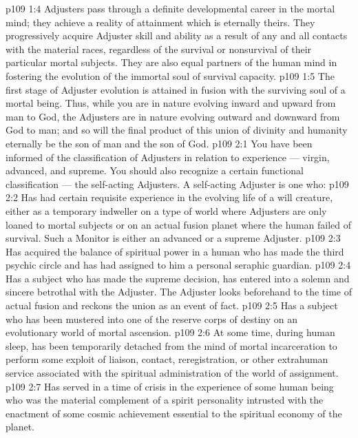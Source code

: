 \vs p109 1:4 Adjusters pass through a definite developmental career in the mortal mind; they achieve a reality of attainment which is eternally theirs. They progressively acquire Adjuster skill and ability as a result of any and all contacts with the material races, regardless of the survival or nonsurvival of their particular mortal subjects. They are also equal partners of the human mind in fostering the evolution of the immortal soul of survival capacity.
\vs p109 1:5 The first stage of Adjuster evolution is attained in fusion with the surviving soul of a mortal being. Thus, while you are in nature evolving inward and upward from man to God, the Adjusters are in nature evolving outward and downward from God to man; and so will the final product of this union of divinity and humanity eternally be the son of man and the son of God.
\vs p109 2:1 You have been informed of the classification of Adjusters in relation to experience --- virgin, advanced, and supreme. You should also recognize a certain functional classification --- the self\hyp{}acting Adjusters. A self\hyp{}acting Adjuster is one who:
\vs p109 2:2 \bibnobreakspace Has had certain requisite experience in the evolving life of a will creature, either as a temporary indweller on a type of world where Adjusters are only loaned to mortal subjects or on an actual fusion planet where the human failed of survival. Such a Monitor is either an advanced or a supreme Adjuster.
\vs p109 2:3 \bibnobreakspace Has acquired the balance of spiritual power in a human who has made the third psychic circle and has had assigned to him a personal seraphic guardian.
\vs p109 2:4 \bibnobreakspace Has a subject who has made the supreme decision, has entered into a solemn and sincere betrothal with the Adjuster. The Adjuster looks beforehand to the time of actual fusion and reckons the union as an event of fact.
\vs p109 2:5 \bibnobreakspace Has a subject who has been mustered into one of the reserve corps of destiny on an evolutionary world of mortal ascension.
\vs p109 2:6 \bibnobreakspace At some time, during human sleep, has been temporarily detached from the mind of mortal incarceration to perform some exploit of liaison, contact, reregistration, or other extrahuman service associated with the spiritual administration of the world of assignment.
\vs p109 2:7 \bibnobreakspace Has served in a time of crisis in the experience of some human being who was the material complement of a spirit personality intrusted with the enactment of some cosmic achievement essential to the spiritual economy of the planet.
